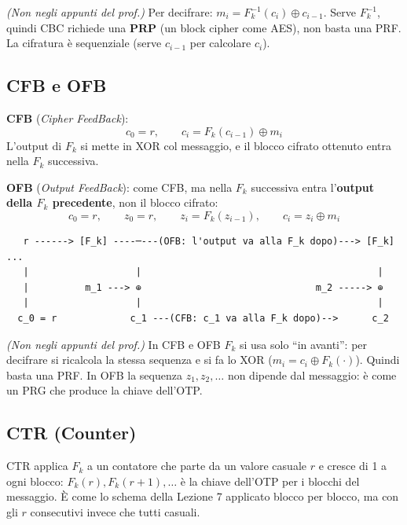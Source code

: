 \begin{nota}
\emph{(Non negli appunti del prof.)} Per decifrare: \(m_i = F_k^{-1}(c_i) \oplus c_{i-1}\). Serve \(F_k^{-1}\), quindi CBC richiede una \textbf{PRP} (un block cipher come AES), non basta una PRF. La cifratura è sequenziale (serve \(c_{i-1}\) per calcolare \(c_i\)).
\end{nota}

\subsection{CFB e OFB}

\textbf{CFB} (\emph{Cipher FeedBack}):
\[
c_0 = r, \qquad c_i = F_k(c_{i-1}) \oplus m_i
\]
L'output di \(F_k\) si mette in XOR col messaggio, e il blocco cifrato ottenuto entra nella \(F_k\) successiva.

\textbf{OFB} (\emph{Output FeedBack}): come CFB, ma nella \(F_k\) successiva entra l'\textbf{output della \(F_k\) precedente}, non il blocco cifrato:
\[
c_0 = r, \qquad z_0 = r, \qquad z_i = F_k(z_{i-1}), \qquad c_i = z_i \oplus m_i
\]

\begin{verbatim}
   r ------> [F_k] ----─---(OFB: l'output va alla F_k dopo)---> [F_k] ...
   |                   |                                          |
   |          m_1 ---> ⊕                               m_2 -----> ⊕
   |                   |                                          |
  c_0 = r             c_1 ---(CFB: c_1 va alla F_k dopo)-->      c_2
\end{verbatim}

\begin{nota}
\emph{(Non negli appunti del prof.)} In CFB e OFB \(F_k\) si usa solo ``in avanti'': per decifrare si ricalcola la stessa sequenza e si fa lo XOR (\(m_i = c_i \oplus F_k(\cdot)\)). Quindi basta una PRF. In OFB la sequenza \(z_1, z_2, \dots\) non dipende dal messaggio: è come un PRG che produce la chiave dell'OTP.
\end{nota}

\subsection{CTR (Counter)}

\begin{inbreve}
CTR applica \(F_k\) a un contatore che parte da un valore casuale \(r\) e cresce di 1 a ogni blocco: \(F_k(r), F_k(r+1), \dots\) è la chiave dell'OTP per i blocchi del messaggio. È come lo schema della Lezione 7 applicato blocco per blocco, ma con gli \(r\) consecutivi invece che tutti casuali.
\end{inbreve}

